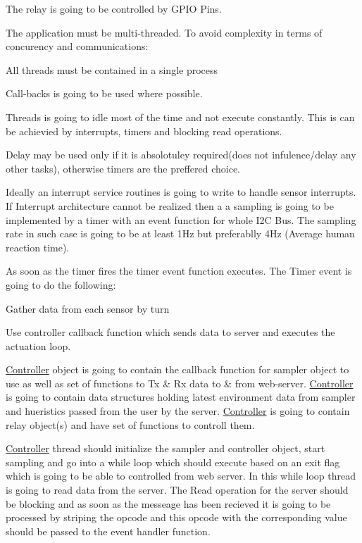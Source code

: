 The relay is going to be controlled by G\+P\+IO Pins.

The application must be multi-\/threaded. To avoid complexity in terms of concurency and communications\+:
\begin{DoxyEnumerate}
\item All threads must be contained in a single process
\item Call-\/backs is going to be used where possible.
\end{DoxyEnumerate}

Threads is going to idle most of the time and not execute constantly. This is can be achievied by interrupts, timers and blocking read operations.

Delay may be used only if it is absolotuley required(does not infulence/delay any other tasks), otherwise timers are the preffered choice.

Ideally an interrupt service routines is going to write to handle sensor interrupts. If Interrupt architecture cannot be realized then a a sampling is going to be implemented by a timer with an event function for whole I2C Bus. The sampling rate in such case is going to be at least 1\+Hz but preferablly 4\+Hz (Average human reaction time).

As soon as the timer fires the timer event function executes. The Timer event is going to do the following\+:
\begin{DoxyEnumerate}
\item Gather data from each sensor by turn
\item Use controller callback function which sends data to server and executes the actuation loop.
\end{DoxyEnumerate}

\hyperlink{classController}{Controller} object is going to contain the callback function for sampler object to use as well as set of functions to Tx \& Rx data to \& from web-\/server. \hyperlink{classController}{Controller} is going to contain data structures holding latest environment data from sampler and hueristics passed from the user by the server. \hyperlink{classController}{Controller} is going to contain relay object(s) and have set of functions to controll them.

\hyperlink{classController}{Controller} thread should initialize the sampler and controller object, start sampling and go into a while loop which should execute based on an exit flag which is going to be able to controlled from web server. In this while loop thread is going to read data from the server. The Read operation for the server should be blocking and as soon as the messeage has been recieved it is going to be processed by striping the opcode and this opcode with the corresponding value should be passed to the event handler function.

